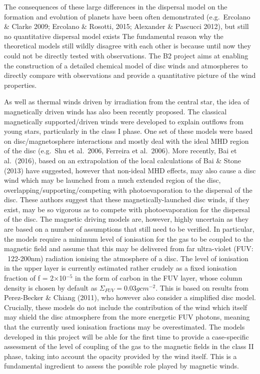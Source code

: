 \documentclass[10pt,fleqn,twoside]{article}
\begin{document}
The consequences of these large differences in the dispersal model on
the formation and evolution of planets have been often demonstrated
(e.g.\ Ercolano \&  Clarke 2009; Ercolano \& Rosotti, 2015; Alexander
\& Pascucci 2012), but still no quantitative dispersal model exists
The fundamental reason why the theoretical models still wildly
disagree with each other is because until now they could not be
directly tested with observations. The B2  project aims at enabling
the construction of a detailed chemical model of disc winds and
atmospheres to directly compare with observations and provide a
quantitative picture of the wind properties. 

As well as thermal winds driven by irradiation from the central star,
the idea of magnetically driven winds has also been recently
proposed.  The classical magnetically supported/driven winds were developed to explain outflows from young stars, particularly in the class I phase. One set of these models were based on disc/magnetosphere interactions and mostly deal with the ideal MHD region of the disc (e.g.\ Shu et al.\ 2006, Ferreira et al.\ 2006). 
More recently, Bai et al.\ (2016), based on an extrapolation of the
local calculations of Bai \& Stone (2013) have suggested, however that
non-ideal MHD effects, may also cause a disc wind which may be
launched from a much extended region of the disc,
overlapping/supporting/competing with photoevaporation to the
dispersal of the disc. These authors suggest that these magnetically-launched disc
winds, if they exist, may be so vigorous as to compete with
photoevaporation for the dispersal of the disc.
The magnetic driving models are, however, highly uncertain as they are
based on a number of assumptions that still need to be verified. In
particular, the models require a minimum level of ionisation for the
gas to be coupled to the magnetic field and assume that this may be
delivered from far ultra-violet (FUV: ~122-200nm) radiation ionising
the atmosphere of a disc. The level of ionisation in the upper layer
is currently estimated rather crudely as a fixed ionisation fraction
of f = 2$\times$10$^{-5}$ in the form of carbon in the FUV layer, whose column
density is chosen by default as $\Sigma_{FUV} = 0.03 g cm^{-2}$. This is based on
results from Perez-Becker \& Chiang (2011), who however also consider
a simplified disc model. Crucially, these models do not include the
contribution of the wind which itself may shield the disc atmosphere
from the more energetic FUV photons, meaning that the currently used
ionisation fractions may be overestimated. 
The models developed in this project will be able for the first time
to provide a case-specific assessment of the level of coupling of the
gas to the magnetic fields in the class II phase, taking into account
the opacity provided by the wind itself. This is a fundamental
ingredient to assess the possible role played by magnetic winds.  
\end{document}
